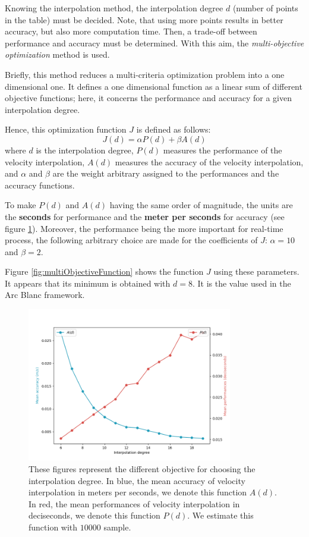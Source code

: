 \documentclass[final]{jcgt}
\def\framework{the Arc Blanc framework\xspace}
\begin{document}
Knowing the interpolation method, the interpolation degree $d$ (number of points in the table) must be decided.
Note, that using more points results in better accuracy, but also more computation time.
Then, a trade-off between performance and accuracy must be determined.
With this aim, the \textit{multi-objective optimization} method is used.

Briefly, this method reduces a multi-criteria optimization problem into a one dimensional one.
It defines a one dimensional function as a linear sum of different objective functions; here, it concerns the performance and accuracy for a given interpolation degree.

Hence, this optimization function $J$ is defined as follows:
\begin{equation}
	J(d) = \alpha P(d) + \beta A(d)
\end{equation}
where $d$ is the interpolation degree, $P(d)$ measures the performance of the velocity interpolation, $A(d)$ measures the accuracy of the velocity interpolation, and $\alpha$ and $\beta$ are the weight arbitrary assigned to the performances and the accuracy functions.

To make $P(d)$ and $A(d)$ having the same order of magnitude, the units are the \textbf{seconds} for performance and the \textbf{meter per seconds} for accuracy (see figure \ref{fig:interpolationCriteria}).
Moreover, the performance being the more important for real-time process, the following arbitrary choice are made for the coefficients of $J$: $\alpha = 10$ and $\beta = 2$.

Figure \ref{fig:multiObjectiveFunction} shows the function $J$ using these parameters. It appears that its minimum is obtained with $d=8$.
It is the value used in \framework.



\begin{figure}[ht]
	\centering
	\includegraphics[width=0.8\textwidth]{Figures/interpolationMeanPerformancesAndAccuracy.png}
	\caption{These figures represent the different objective for choosing the interpolation degree. In blue, the mean accuracy of velocity interpolation in meters per seconds, we denote this function $A(d)$. In red, the mean performances of velocity interpolation in deciseconds, we denote this function $P(d)$. We estimate this function with $10000$ sample.}
	\label{fig:interpolationCriteria}
\end{figure}
\end{document}
